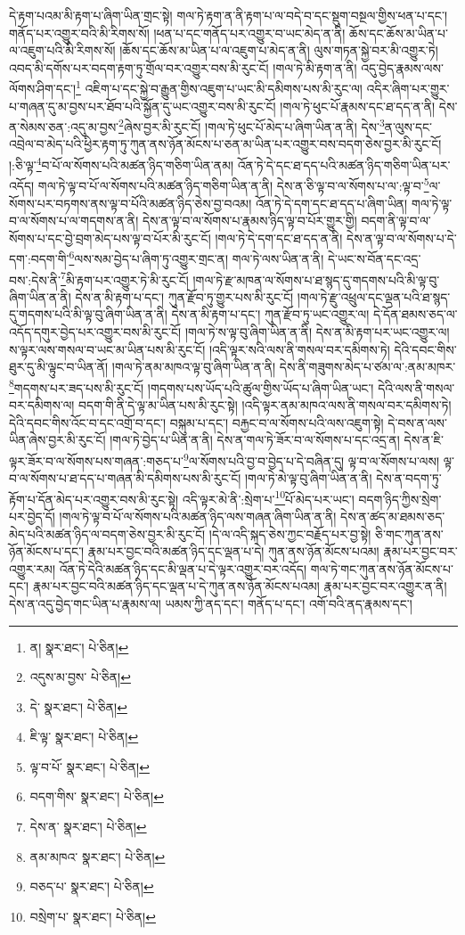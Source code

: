 དེ་རྟག་པའམ་མི་རྟག་པ་ཞིག་ཡིན་གྲང་སྟེ། གལ་ཏེ་རྟག་ན་ནི་རྟག་པ་ལ་བདེ་བ་དང་སྡུག་བསྔལ་གྱིས་ཕན་པ་དང་། གནོད་པར་འགྱུར་བའི་མི་རིགས་སོ། །ཕན་པ་དང་གནོད་པར་འགྱུར་བ་ཡང་མེད་ན་ནི། ཆོས་དང་ཆོས་མ་ཡིན་པ་ལ་འཇུག་པའི་མི་རིགས་སོ། །ཆོས་དང་ཆོས་མ་ཡིན་པ་ལ་འཇུག་པ་མེད་ན་ནི། ལུས་གཏན་སྐྱེ་བར་མི་འགྱུར་ཏེ། འབད་མི་དགོས་པར་བདག་རྟག་ཏུ་གྲོལ་བར་འགྱུར་བས་མི་རུང་ངོ། །གལ་ཏེ་མི་རྟག་ན་ནི། འདུ་བྱེད་རྣམས་ལས་ལོགས་ཤིག་དང་།\footnote{ན།  སྣར་ཐང་།  པེ་ཅིན། } འཇིག་པ་དང་སྐྱེ་བ་རྒྱུན་གྱིས་འཇུག་པ་ཡང་མི་དམིགས་པས་མི་རུང་ལ། འདིར་ཞིག་པར་གྱུར་པ་གཞན་དུ་མ་བྱས་པར་ཐོབ་པའི་སྐྱོན་དུ་ཡང་འགྱུར་བས་མི་རུང་ངོ། །གལ་ཏེ་ཕུང་པོ་རྣམས་དང་ཐ་དད་ན་ནི། དེས་ན་སེམས་ཅན་:འདུ་མ་བྱས་\footnote{འདུས་མ་བྱས་  པེ་ཅིན། }ཞེས་བྱར་མི་རུང་ངོ། །གལ་ཏེ་ཕུང་པོ་མེད་པ་ཞིག་ཡིན་ན་ནི། དེས་\footnote{དེ་  སྣར་ཐང་།  པེ་ཅིན། }ན་ལུས་དང་འབྲེལ་བ་མེད་པའི་ཕྱིར་རྟག་ཏུ་ཀུན་ནས་ཉོན་མོངས་པ་ཅན་མ་ཡིན་པར་འགྱུར་བས་བདག་ཅེས་བྱར་མི་རུང་ངོ། །:ཅི་ལྟ་\footnote{ཇི་ལྟ་  སྣར་ཐང་།  པེ་ཅིན། }བ་པོ་ལ་སོགས་པའི་མཚན་ཉིད་གཅིག་ཡིན་ནམ། འོན་ཏེ་དེ་དང་ཐ་དད་པའི་མཚན་ཉིད་གཅིག་ཡིན་པར་འདོད། གལ་ཏེ་ལྟ་བ་པོ་ལ་སོགས་པའི་མཚན་ཉིད་གཅིག་ཡིན་ན་ནི། དེས་ན་ཅི་ལྟ་བ་ལ་སོགས་པ་ལ་:ལྟ་བ་\footnote{ལྟ་བ་པོ་  སྣར་ཐང་།  པེ་ཅིན། }ལ་སོགས་པར་བཏགས་ནས་ལྟ་བ་པོའི་མཚན་ཉིད་ཅེས་བྱ་བའམ། འོན་ཏེ་དེ་དག་དང་ཐ་དད་པ་ཞིག་ཡིན། གལ་ཏེ་ལྟ་བ་ལ་སོགས་པ་ལ་གདགས་ན་ནི། དེས་ན་ལྟ་བ་ལ་སོགས་པ་རྣམས་ཉིད་ལྟ་བ་པོར་གྱུར་གྱི། བདག་ནི་ལྟ་བ་ལ་སོགས་པ་དང་བྱེ་བྲག་མེད་པས་ལྟ་བ་པོར་མི་རུང་ངོ། །གལ་ཏེ་དེ་དག་དང་ཐ་དད་ན་ནི། དེས་ན་ལྟ་བ་ལ་སོགས་པ་དེ་དག་:བདག་གི་\footnote{བདག་གིས་  སྣར་ཐང་།  པེ་ཅིན། }ལས་སམ་བྱེད་པ་ཞིག་ཏུ་འགྱུར་གྲང་ན། གལ་ཏེ་ལས་ཡིན་ན་ནི། དེ་ཡང་ས་བོན་དང་འདྲ་བས་:དེས་ནི་\footnote{དེས་ན་  སྣར་ཐང་།  པེ་ཅིན། }མི་རྟག་པར་འགྱུར་ཏེ་མི་རུང་ངོ། །གལ་ཏེ་རྫ་མཁན་ལ་སོགས་པ་ཐ་སྙད་དུ་གདགས་པའི་མི་ལྟ་བུ་ཞིག་ཡིན་ན་ནི། དེས་ན་མི་རྟག་པ་དང་། ཀུན་རྫོབ་ཏུ་གྱུར་པས་མི་རུང་ངོ། །གལ་ཏེ་རྫུ་འཕྲུལ་དང་ལྡན་པའི་ཐ་སྙད་དུ་གདགས་པའི་མི་ལྟ་བུ་ཞིག་ཡིན་ན་ནི། དེས་ན་མི་རྟག་པ་དང་། ཀུན་རྫོབ་ཏུ་ཡང་འགྱུར་ལ། དེ་དོན་ཐམས་ཅད་ལ་འདོད་དགུར་བྱེད་པར་འགྱུར་བས་མི་རུང་ངོ། །གལ་ཏེ་ས་ལྟ་བུ་ཞིག་ཡིན་ན་ནི། དེས་ན་མི་རྟག་པར་ཡང་འགྱུར་ལ། ས་ལྟར་ལས་གསལ་བ་ཡང་མ་ཡིན་པས་མི་རུང་ངོ། །འདི་ལྟར་སའི་ལས་ནི་གསལ་བར་དམིགས་ཏེ། དེའི་དབང་གིས་ཐུར་དུ་མི་ལྟུང་བ་ཡིན་ནོ། །གལ་ཏེ་ནམ་མཁའ་ལྟ་བུ་ཞིག་ཡིན་ན་ནི། དེས་ནི་གཟུགས་མེད་པ་ཙམ་ལ་:ནམ་མཁར་\footnote{ནམ་མཁའ་  སྣར་ཐང་།  པེ་ཅིན། }གདགས་པར་ཟད་པས་མི་རུང་ངོ། །གདགས་པས་ཡོད་པའི་ཚུལ་གྱིས་ཡོད་པ་ཞིག་ཡིན་ཡང་། དེའི་ལས་ནི་གསལ་བར་དམིགས་ལ། བདག་གི་ནི་དེ་ལྟ་མ་ཡིན་པས་མི་རུང་སྟེ། །འདི་ལྟར་ནམ་མཁའ་ལས་ནི་གསལ་བར་དམིགས་ཏེ། དེའི་དབང་གིས་འོང་བ་དང་འགྲོ་བ་དང་། བསྐུམ་པ་དང་། བརྐྱང་བ་ལ་སོགས་པའི་ལས་འཇུག་སྟེ། དེ་བས་ན་ལས་ཡིན་ཞེས་བྱར་མི་རུང་ངོ། །གལ་ཏེ་བྱེད་པ་ཡིན་ན་ནི། དེས་ན་གལ་ཏེ་ཟོར་བ་ལ་སོགས་པ་དང་འདྲ་ན། དེས་ན་ཇི་ལྟར་ཟོར་བ་ལ་སོགས་པས་གཞན་:གཅད་པ་\footnote{བཅད་པ་  སྣར་ཐང་།  པེ་ཅིན། }ལ་སོགས་པའི་བྱ་བ་བྱེད་པ་དེ་བཞིན་དུ། ལྟ་བ་ལ་སོགས་པ་ལས། ལྟ་བ་ལ་སོགས་པ་ཐ་དད་པ་གཞན་མི་དམིགས་པས་མི་རུང་ངོ། །གལ་ཏེ་མེ་ལྟ་བུ་ཞིག་ཡིན་ན་ནི། དེས་ན་བདག་ཏུ་རྟོག་པ་དོན་མེད་པར་འགྱུར་བས་མི་རུང་སྟེ། འདི་ལྟར་མེ་ནི་:སྲེག་པ་\footnote{བསྲེག་པ་  སྣར་ཐང་།  པེ་ཅིན། }པོ་མེད་པར་ཡང་། བདག་ཉིད་ཀྱིས་སྲེག་པར་བྱེད་དོ། །གལ་ཏེ་ལྟ་བ་པོ་ལ་སོགས་པའི་མཚན་ཉིད་ལས་གཞན་ཞིག་ཡིན་ན་ནི། དེས་ན་ཚད་མ་ཐམས་ཅད་མེད་པའི་མཚན་ཉིད་ལ་བདག་ཅེས་བྱར་མི་རུང་ངོ། །དེ་ལ་འདི་སྐད་ཅེས་ཀྱང་བརྗོད་པར་བྱ་སྟེ། ཅི་གང་ཀུན་ནས་ཉོན་མོངས་པ་དང་། རྣམ་པར་བྱང་བའི་མཚན་ཉིད་དང་ལྡན་པ་དེ། ཀུན་ནས་ཉོན་མོངས་པའམ། རྣམ་པར་བྱང་བར་འགྱུར་རམ། འོན་ཏེ་དེའི་མཚན་ཉིད་དང་མི་ལྡན་པ་དེ་ལྟར་འགྱུར་བར་འདོད། གལ་ཏེ་གང་ཀུན་ནས་ཉོན་མོངས་པ་དང་། རྣམ་པར་བྱང་བའི་མཚན་ཉིད་དང་ལྡན་པ་དེ་ཀུན་ནས་ཉོན་མོངས་པའམ། རྣམ་པར་བྱང་བར་འགྱུར་ན་ནི། དེས་ན་འདུ་བྱེད་གང་ཡིན་པ་རྣམས་ལ། ཡམས་ཀྱི་ནད་དང་། གནོད་པ་དང་། འགོ་བའི་ནད་རྣམས་དང་། 